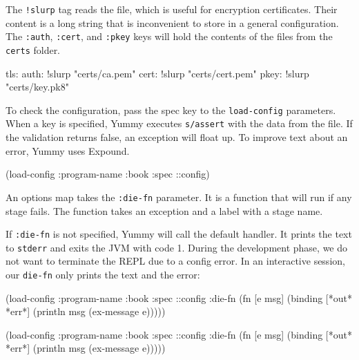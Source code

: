 \fi

The \verb|!slurp| tag reads the file, which is useful for encryption certificates. Their content is a long string that is inconvenient to store in a general configuration. The \verb|:auth|, \verb|:cert|, and \verb|:pkey| keys will hold the contents of the files from the \verb|certs| folder.

\begin{yaml}
tls:
  auth: !slurp "certs/ca.pem"
  cert: !slurp "certs/cert.pem"
  pkey: !slurp "certs/key.pk8"
\end{yaml}


To check the configuration, pass the spec key to the \verb|load-config| parameters. When a key is specified, Yummy executes \verb|s/assert| with the data from the file. If the validation returns false, an exception will float up. To improve text about an error, Yummy uses Expound.

\begin{clojure}
(load-config {:program-name :book
              :spec ::config})
\end{clojure}


An options map takes the \verb|:die-fn| parameter. It is a function that will run if any stage fails. The function takes an exception and a label with a stage name.


If \verb|:die-fn| is not specified, Yummy will call the default handler. It prints the text to \verb|stderr| and exits the JVM with code 1. During the development phase, we do not want to terminate the REPL due to a config error. In an interactive session, our \verb|die-fn| only prints the text and the error:

\ifnarrow

\begin{clojure}
(load-config
 {:program-name :book
  :spec ::config
  :die-fn (fn [e msg]
            (binding [*out* *err*]
              (println msg
                (ex-message e))))})
\end{clojure}

\else

\begin{clojure}
(load-config
 {:program-name :book
  :spec ::config
  :die-fn (fn [e msg]
            (binding [*out* *err*]
              (println msg (ex-message e))))})
\end{clojure}


